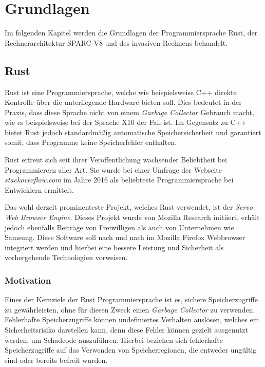 \chapter{Grundlagen}\label{sec:basics}

Im folgenden Kapitel werden die Grundlagen der Programmiersprache Rust, der Rechnerarchitektur SPARC-V8 und
des invasiven Rechnens behandelt.

\section{Rust}

Rust ist eine Programmiersprache, welche wie beispielsweise C++ direkte Kontrolle über die
unterliegende Hardware bieten soll. Dies bedeutet in der Praxis, dass diese Sprache nicht von einem
\textit{Garbage Collector} Gebrauch macht, wie es beispielsweise bei der Sprache X10 der Fall ist.
Im Gegensatz zu C++ bietet Rust jedoch
standardmäßig automatische Speichersicherheit und garantiert somit, dass Programme keine Speicherfehler enthalten.
\cite{theRustLanguage}

Rust erfreut sich seit ihrer Veröffentlichung wachsender Beliebtheit bei Programmierern aller Art. Sie wurde
bei einer Umfrage der Webseite \textit{stackoverflow.com} im Jahre 2016 als beliebteste Programmiersprache bei 
Entwicklern ermittelt\cite{stackoverflowSurvey}.

Das wohl derzeit prominenteste Projekt, welches Rust verwendet, ist der \textit{Servo Web Browser Engine}.
Dieses Projekt wurde von Mozilla Research initiiert, erhält jedoch ebenfalls Beiträge von Freiwilligen
als auch von Unternehmen wie Samsung.
Diese Software soll nach und nach im Mozilla Firefox Webbrowser integriert werden und hierbei eine bessere
Leistung und Sicherheit als vorhergehende Technologien vorweisen\cite{engineeringServo}.

\subsection{Motivation}

Eines der Kernziele der Rust Programmiersprache ist es, sichere Speicherzugriffe zu gewährleisten, ohne
für diesen Zweck einen \textit{Garbage Collector} zu verwenden. Fehlerhafte Speicherzugriffe können undefiniertes
Verhalten auslösen, welches ein Sicherheitsrisiko darstellen kann, denn diese Fehler können gezielt ausgenutzt
werden, um Schadcode auszuführen. Hierbei beziehen sich fehlerhafte Speicherzugriffe auf das Verwenden von 
Speicherregionen, die entweder ungültig sind oder bereits befreit wurden.
\cite{engineeringServo}\cite{undefinedBehaviour}

